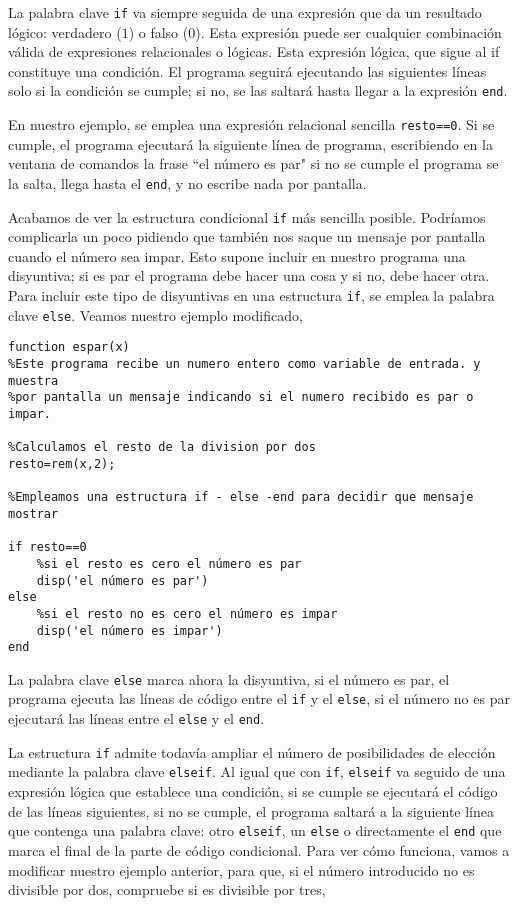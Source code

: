 La palabra clave \texttt{if} va siempre seguida de una expresión que da un resultado lógico: verdadero ($1$) o falso ($0$). Esta expresión puede ser cualquier combinación válida de expresiones relacionales o lógicas. Esta expresión lógica, que sigue al if constituye una condición. El programa seguirá ejecutando las siguientes líneas solo si la condición se cumple; si no, se las saltará hasta llegar a la expresión \texttt{end}.

En nuestro ejemplo, se emplea una expresión relacional sencilla \texttt{resto==0}. Si se cumple, el programa ejecutará la siguiente línea de programa, escribiendo en la ventana de comandos la frase ``el número es par"  si no se cumple el programa se la salta, llega hasta el \texttt{end}, y no escribe nada por pantalla. 

Acabamos de ver la estructura condicional \texttt{if} más sencilla posible. Podríamos complicarla un poco pidiendo que también nos saque un mensaje por pantalla cuando el número sea impar. Esto supone incluir en nuestro programa una disyuntiva; si es par el programa debe hacer una cosa y si no, debe hacer otra. Para incluir este tipo de disyuntivas en una estructura \texttt{if}, se emplea la palabra clave \texttt{else}. Veamos nuestro ejemplo modificado,
\begin{verbatim}
function espar(x)
%Este programa recibe un numero entero como variable de entrada. y muestra
%por pantalla un mensaje indicando si el numero recibido es par o impar.

%Calculamos el resto de la division por dos
resto=rem(x,2);

%Empleamos una estructura if - else -end para decidir que mensaje mostrar

if resto==0
    %si el resto es cero el número es par
    disp('el número es par')
else
    %si el resto no es cero el número es impar
    disp('el número es impar')
end 
\end{verbatim}

La palabra clave \texttt{else} marca ahora la disyuntiva, si el número es par, el programa ejecuta las líneas de código entre el \texttt{if} y el \texttt{else}, si el número no es par ejecutará las líneas entre el \texttt{else} y el \texttt{end}.

La estructura \texttt{if} admite todavía ampliar el número de posibilidades de elección mediante la palabra clave \texttt{elseif}. Al igual que  con \texttt{if}, \texttt{elseif} va seguido de una expresión lógica que establece una condición, si se cumple se ejecutará el código de las líneas siguientes, si no se cumple, el programa saltará a la siguiente línea que contenga una palabra clave: otro \texttt{elseif}, un \texttt{else} o directamente el \texttt{end} que marca el final de la parte de código condicional. Para ver cómo funciona, vamos a modificar nuestro ejemplo anterior, para que, si el número introducido no es divisible por dos, compruebe si es divisible por tres,


